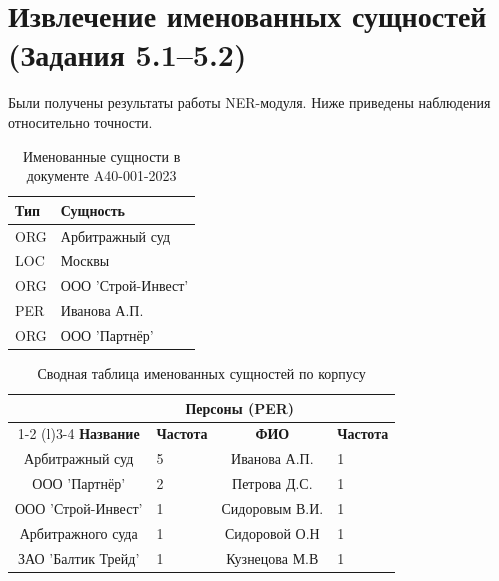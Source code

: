 \documentclass[12pt, a4paper]{report}
\begin{document}
\section{Извлечение именованных сущностей (Задания 5.1–5.2)}

Были получены результаты работы NER-модуля. Ниже приведены наблюдения относительно точности.

\begin{table}[h]
  \centering
  \caption{Именованные сущности в документе A40-001-2023}
  \label{tab:ner_example}
  \begin{tabularx}{0.7\textwidth}{l X}
    \toprule
    \rowcolor{LightBlue}
    \textsf{\textbf{Тип}} & \textsf{\textbf{Сущность}} \\
    \midrule
    ORG & Арбитражный суд \\
    LOC & Москвы \\
    ORG & ООО 'Строй-Инвест' \\
    PER & Иванова А.П. \\
    ORG & ООО 'Партнёр' \\
    \bottomrule
  \end{tabularx}
\end{table}

\begin{table}[h]
  \centering
  \caption{Сводная таблица именованных сущностей по корпусу}
  \label{tab:ner_summary}
  \begin{tabularx}{0.9\textwidth}{c X c X}
    \toprule
    \rowcolor{LightBlue}
    \multicolumn{2}{c}{\textsf{\textbf{Организации (ORG)}}} &
    \multicolumn{2}{c}{\textsf{\textbf{Персоны (PER)}}} \\
    \cmidrule(r){1-2} \cmidrule(l){3-4}
    \textsf{\textbf{Название}} & \textsf{\textbf{Частота}} & \textsf{\textbf{ФИО}} & \textsf{\textbf{Частота}} \\
    \midrule
    Арбитражный суд & 5 & Иванова А.П. & 1 \\
    ООО 'Партнёр' & 2 & Петрова Д.С. & 1 \\
    ООО 'Строй-Инвест' & 1 & Сидоровым В.И. & 1 \\
    Арбитражного суда & 1 & Сидоровой О.Н & 1 \\
    ЗАО 'Балтик Трейд' & 1 & Кузнецова М.В & 1 \\
    \bottomrule
  \end{tabularx}
\end{table}
\end{document}
